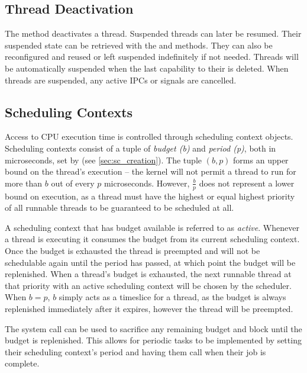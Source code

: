 \subsection{Thread Deactivation}
\label{sec:thread_deactivation}

The  method deactivates a thread.
Suspended threads can later be resumed.
Their suspended state can be retrieved with the
 and
 methods.
They can also be reconfigured and
reused or left suspended indefinitely if not needed. Threads will be
automatically suspended when the last capability to their  is
deleted.
When threads are suspended, any active IPCs or signals are cancelled.

\subsection{Scheduling Contexts}
\label{sec:scheduling_contexts}

Access to CPU execution time is controlled through scheduling context objects.
Scheduling contexts consist of a tuple of
\textit{budget (b)} and \textit{period (p)}, both in microseconds, set by  (see \autoref{sec:sc_creation}).
The tuple $(b, p)$ forms an upper bound on the thread's execution --
the kernel will not permit a thread to run for more than $b$ out of every $p$ microseconds.
However, $\frac{b}{p}$ does not represent a lower bound on execution, as a thread must have the highest or equal highest priority of all runnable threads to be guaranteed to be scheduled at all.

A scheduling context that has budget available is referred to as \emph{active}.
Whenever a thread is executing it consumes the budget from its current scheduling context.
Once the budget is exhausted the thread is preempted and will not be schedulable again until the period has passed, at which
point the budget will be replenished.
When a thread's budget is exhausted, the next runnable thread at that priority with an active scheduling context will be chosen by the scheduler.
When $b = p$, $b$ simply acts as a timeslice for a thread, as the budget is always replenished immediately after it expires, however the thread will be preempted.

The system call  can be used to sacrifice any remaining budget and block until the budget is replenished.
This allows for periodic tasks to be implemented by setting their scheduling context's period and having them call  when their job is complete.


